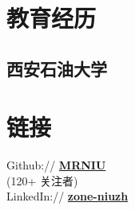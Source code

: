 \documentclass[]{deedy-resume-openfont}
\begin{document}
%
%
\lastupdated

%
%

%
%

\begin{minipage}[t]{0.25\textwidth}


\section{教育经历}
\subsection{西安石油大学}
\sectionsep


\section{链接}
Github:// \href{https://github.com/MRNIU}{\bf MRNIU} \\
(120+ 关注者) \\
LinkedIn://  \href{https://www.linkedin.com/in/zone-niuzh}{\bf zone-niuzh} \\
\sectionsep




\end{minipage}
\end{document}
